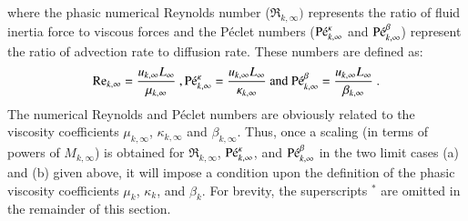 %
where the phasic numerical Reynolds number ($\Re_{k,\infty})$ represents the ratio of fluid inertia force to viscous forces and 
the P\'eclet numbers ($\textrm{P\'e}_{k,\infty}^\kappa$ and $\textrm{P\'e}_{k,\infty}^\beta$) represent the ratio of advection rate to diffusion rate. These numbers are defined as:
%
\begin{equation}
\label{eq:ref_numb}
\Re_{k,\infty} = \frac{u_{k,\infty} L_\infty}{\mu_{k,\infty}} \ ,
\Pe_{k,\infty}^\kappa = \frac{u_{k,\infty} L_\infty}{\kappa_{k,\infty}} \text{ and }
\Pe_{k,\infty}^\beta = \frac{u_{k,\infty} L_\infty}{\beta_{k,\infty}} \ .
\end{equation}
%
The numerical Reynolds and P\'eclet numbers are obviously related to the 
viscosity coefficients $\mu_{k,\infty}$, $\kappa_{k,\infty}$ and $\beta_{k,\infty}$. Thus, once a scaling (in terms of powers of $M_{k,\infty}$) 
is obtained for $\Re_{k,\infty}$, $\textrm{P\'e}_{k,\infty}^\kappa$, and $\textrm{P\'e}_{k,\infty}^\beta$ in the two limit cases (a) and (b) given above, it will 
impose a condition upon the definition of the phasic viscosity coefficients $\mu_k$, $\kappa_k$, and $\beta_k$. 
For brevity, the superscripts $^*$ are omitted in the remainder of this section. 
%
